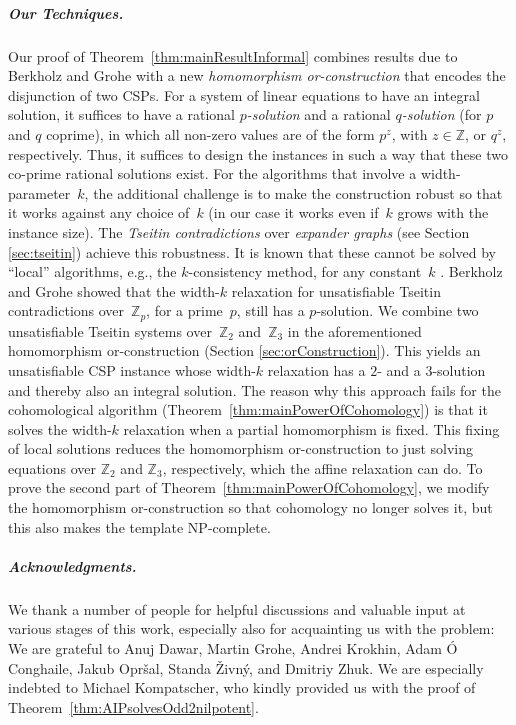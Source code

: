 \documentclass[a4paper,english, thm-restate]{lipics-v2021}
\newcommand{\ZZ}{\mathbb{Z}}
\newcommand{\bbZ}{\mathbb{Z}}
\begin{document}
	\subparagraph*{Our Techniques.}
	Our proof of Theorem~\ref{thm:mainResultInformal}
	combines results due to Berkholz and Grohe \cite{BerkholzGrohe2017} with a new \emph{homomorphism or-construction} that encodes the disjunction of two CSPs.
	For a system of linear equations 
	to have an integral solution, it suffices to have a rational \emph{$p$-solution} and a rational \emph{$q$-solution} (for $p$ and $q$ coprime),
	in which all non-zero values are of the form $p^z$, with $z \in \bbZ$, or $q^z$, respectively.
	Thus, it suffices to design the instances in such a way that these two co-prime rational solutions exist. 
	For the algorithms that involve a width-parameter~$k$, the additional challenge is to make the construction robust so that it works against any choice of~$k$ (in our case it works even if~$k$ grows with the instance size).
	The \emph{Tseitin contradictions} \cite{Tseitin1983} over \emph{expander graphs} (see Section \ref{sec:tseitin}) achieve this robustness. 
	It is known that these cannot be solved by ``local'' algorithms, e.g., the $k$-consistency method, for any constant~$k$ \cite{AtseriasBulatovDalmau2007}.
	Berkholz and Grohe showed that
	the width-$k$ relaxation for unsatisfiable Tseitin contradictions over~$\ZZ_p$, for a prime~$p$, still has a $p$-solution.
	We combine two unsatisfiable Tseitin systems over~$\bbZ_2$ and~$\bbZ_3$ in the aforementioned homomorphism or-construction (Section \ref{sec:orConstruction}). This yields an unsatisfiable CSP instance whose width-$k$ relaxation has a $2$- and a $3$-solution and thereby also an integral solution.
	The reason why this approach fails for the cohomological algorithm (Theorem~\ref{thm:mainPowerOfCohomology})
	is that it solves the width-$k$ relaxation when a partial homomorphism is fixed. This fixing of local solutions reduces the homomorphism or-construction to just solving equations over $\bbZ_2$ and $\bbZ_3$, respectively, which the affine relaxation can do. To prove the second part of Theorem~\ref{thm:mainPowerOfCohomology}, we modify the homomorphism or-construction so that cohomology no longer solves it, but this also makes the template NP-complete.

	
	
	
\subparagraph*{Acknowledgments.} 
We thank a number of people for helpful discussions and valuable input at various stages of this work, especially also for acquainting us with the problem:
We are grateful to Anuj Dawar, Martin Grohe, Andrei Krokhin, Adam Ó Conghaile, Jakub Opr\v{s}al, Standa \v{Z}ivn\'y, and Dmitriy Zhuk.
We are especially indebted to Michael Kompatscher,
who kindly provided us with the proof of Theorem~\ref{thm:AIPsolvesOdd2nilpotent}.
	
\end{document}
